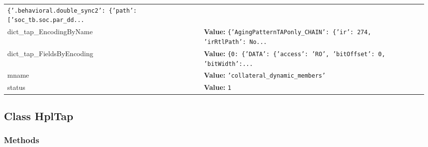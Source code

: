 \begin{longtable}{|p{\varnamewidth}|p{\vardescrwidth}|l}
{\tt \texttt{\{}\texttt{'}\texttt{.behavioral.double\_sync2}\texttt{'}\texttt{: }\texttt{\{}\texttt{'}\texttt{path}\texttt{'}\texttt{: }\texttt{[}\texttt{'}\texttt{soc\_tb.soc.par\_dd}\texttt{...}}&\\
\cline{1-2}
\raggedright d\-i\-c\-t\-\_\-t\-a\-p\-\_\-E\-n\-c\-o\-d\-i\-n\-g\-B\-y\-N\-a\-m\-e\- & \raggedright \textbf{Value:} 
{\tt \texttt{\{}\texttt{'}\texttt{AgingPatternTAPonly\_CHAIN}\texttt{'}\texttt{: }\texttt{\{}\texttt{'}\texttt{ir}\texttt{'}\texttt{: }274\texttt{, }\texttt{'}\texttt{irRtlPath}\texttt{'}\texttt{: }No\texttt{...}}&\\
\cline{1-2}
\raggedright d\-i\-c\-t\-\_\-t\-a\-p\-\_\-F\-i\-e\-l\-d\-s\-B\-y\-E\-n\-c\-o\-d\-i\-n\-g\- & \raggedright \textbf{Value:} 
{\tt \texttt{\{}0\texttt{: }\texttt{\{}\texttt{'}\texttt{DATA}\texttt{'}\texttt{: }\texttt{\{}\texttt{'}\texttt{access}\texttt{'}\texttt{: }\texttt{'}\texttt{RO}\texttt{'}\texttt{, }\texttt{'}\texttt{bitOffset}\texttt{'}\texttt{: }0\texttt{, }\texttt{'}\texttt{bitWidth}\texttt{'}\texttt{:}\texttt{...}}&\\
\cline{1-2}
\raggedright m\-n\-a\-m\-e\- & \raggedright \textbf{Value:} 
{\tt \texttt{'}\texttt{collateral\_dynamic\_members}\texttt{'}}&\\
\cline{1-2}
\raggedright s\-t\-a\-t\-u\-s\- & \raggedright \textbf{Value:} 
{\tt 1}&\\
\cline{1-2}
\end{longtable}



\subsection{Class HplTap}

    \label{hpl_tap:HplTap}


  \subsubsection{Methods}

